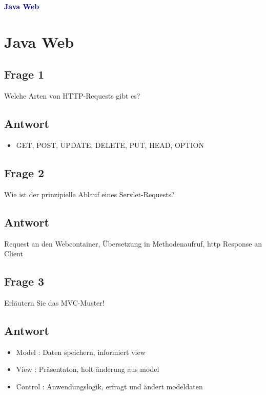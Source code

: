 \textbf{\textcolor{darkblue}{ Java Web}}~

\section*{Java Web}
\subsection*{Frage 1}
Welche Arten von HTTP-Requests gibt es?
\subsection*{Antwort}
\begin{itemize}
	\item GET, POST, UPDATE, DELETE, PUT, HEAD, OPTION
\end{itemize}

\subsection*{Frage 2}
Wie ist der prinzipielle Ablauf eines Servlet-Requests?
\subsection*{Antwort}
Request an den Webcontainer, Übersetzung in Methodenaufruf, http Response an Client

\subsection*{Frage 3}
Erläutern Sie das MVC-Muster!
\subsection*{Antwort}
\begin{itemize}
	\item Model : Daten speichern, informiert view
	\item View : Präsentaton, holt änderung aus model
	\item Control : Anwendungslogik, erfragt und ändert modeldaten
\end{itemize}